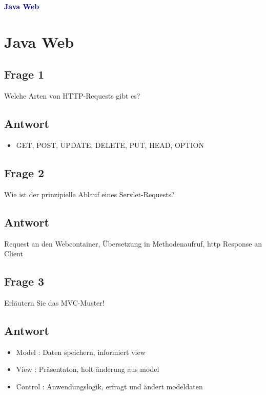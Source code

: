 \textbf{\textcolor{darkblue}{ Java Web}}~

\section*{Java Web}
\subsection*{Frage 1}
Welche Arten von HTTP-Requests gibt es?
\subsection*{Antwort}
\begin{itemize}
	\item GET, POST, UPDATE, DELETE, PUT, HEAD, OPTION
\end{itemize}

\subsection*{Frage 2}
Wie ist der prinzipielle Ablauf eines Servlet-Requests?
\subsection*{Antwort}
Request an den Webcontainer, Übersetzung in Methodenaufruf, http Response an Client

\subsection*{Frage 3}
Erläutern Sie das MVC-Muster!
\subsection*{Antwort}
\begin{itemize}
	\item Model : Daten speichern, informiert view
	\item View : Präsentaton, holt änderung aus model
	\item Control : Anwendungslogik, erfragt und ändert modeldaten
\end{itemize}